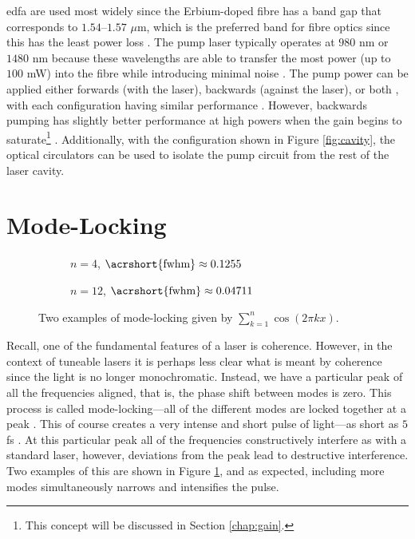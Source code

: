 \gls{edfa} are used most widely since the Erbium-doped fibre has a band gap that corresponds to $1.54$--$1.57$ $\mu$m, which is the preferred band for fibre optics since this has the least power loss \cite{agrawal2002, alazzawi, starodoumov}. The pump laser typically operates at $980$ nm or $1480$ nm because these wavelengths are able to transfer the most power (up to $100$ mW) into the fibre while introducing minimal noise \cite{agrawal2002, alazzawi, becker, starodoumov}. The pump power can be applied either forwards (with the laser), backwards (against the laser), or both \cite{alazzawi}, with each configuration having similar performance \cite{agrawal2002}. However, backwards pumping has slightly better performance at high powers when the gain begins to saturate\footnote{This concept will be discussed in Section \ref{chap:gain}.} \cite{agrawal2002}. Additionally, with the configuration shown in Figure \ref{fig:cavity}, the optical circulators can be used to isolate the pump circuit from the rest of the laser cavity. \\

\section{Mode-Locking}
\begin{figure}[tbp]
\centering
\begin{subfigure}{0.5\textwidth}

\caption{$n = 4$, $\text{\acrshort{fwhm}} \approx 0.1255$}
\end{subfigure}%
\begin{subfigure}{0.5\textwidth}

\caption{$n = 12$, $\text{\acrshort{fwhm}} \approx 0.04711$}
\end{subfigure}
\caption[Two examples of mode-locking.]{Two examples of mode-locking given by $\displaystyle \sum_{k = 1}^n \cos \left( 2 \pi k x \right)$.}
\label{fig:ml}
\end{figure}
Recall, one of the fundamental features of a laser is coherence. However, in the context of tuneable lasers it is perhaps less clear what is meant by coherence since the light is no longer monochromatic. Instead, we have a particular peak of all the frequencies aligned, that is, the phase shift between modes is zero. This process is called mode-locking---all of the different modes are locked together at a peak \cite{agrawal2013, hausbook, silfvast}. This of course creates a very intense and short pulse of light---as short as $5$ fs \cite{silfvast}. At this particular peak all of the frequencies constructively interfere as with a standard laser, however, deviations from the peak lead to destructive interference. Two examples of this are shown in Figure \ref{fig:ml}, and as expected, including more modes simultaneously narrows and intensifies the pulse. \\



